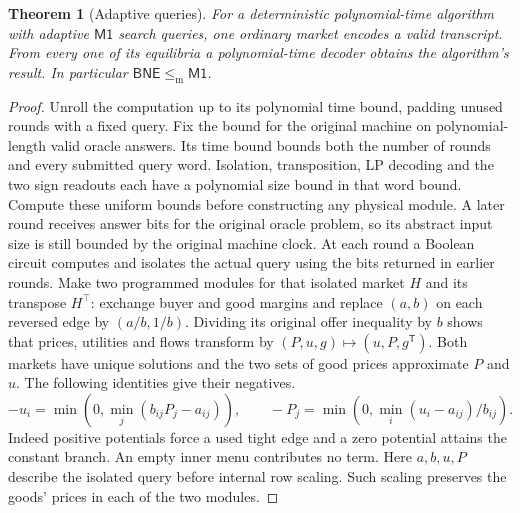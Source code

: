 \documentclass[11pt,oneside,openany,notitlepage]{report}
\newtheorem{theorem}{Theorem}[chapter]
\newcommand{\Market}{\mathsf{M1}}
\newcommand{\BNE}{\mathsf{BNE}}
\newcommand{\dd}{\mathrel{\leq_{\mathrm m}}}
\begin{document}
\begin{theorem}[Adaptive queries]\label{thm:compile}
For a deterministic polynomial-time algorithm with adaptive \(\Market\)
search queries, one ordinary market encodes a valid transcript. From
every one of its equilibria a polynomial-time decoder obtains the
algorithm's result. In particular \(\BNE\dd\Market\).
\end{theorem}
\begin{proof}
Unroll the computation up to its polynomial time bound, padding unused
rounds with a fixed query. Fix the bound for the original machine on
polynomial-length valid oracle answers. Its time bound bounds both the
number of rounds and every submitted query word. Isolation, transposition,
LP decoding and the two sign readouts each have a polynomial size bound
in that word bound. Compute these uniform bounds before constructing any
physical module. A later round receives answer bits for the original
oracle problem, so its abstract input size is still bounded by the
original machine clock. At each round a Boolean circuit computes and
isolates the actual query using the bits returned in earlier rounds.
Make two programmed modules for that isolated market \(H\) and its
transpose \(H^\top\): exchange buyer and good margins and replace
\((a,b)\) on each reversed edge by \((a/b,1/b)\). Dividing its original
offer inequality by \(b\) shows that prices, utilities and flows
transform by \((P,u,g)\mapsto(u,P,g^{\mathsf T})\). Both markets have
unique solutions and the two sets of good prices approximate \(P\) and \(u\).
The following identities give their negatives.
\[
 -u_i=\min(0,\min_j(b_{ij}P_j-a_{ij})),\qquad
 -P_j=\min(0,\min_i (u_i-a_{ij})/b_{ij}).
\]
Indeed positive potentials force a used tight edge and a zero potential
attains the constant branch. An empty inner menu contributes no term.
Here \(a,b,u,P\) describe the isolated query before internal row scaling.
Such scaling preserves the goods' prices in each of the two modules.


\end{proof}
\end{document}
